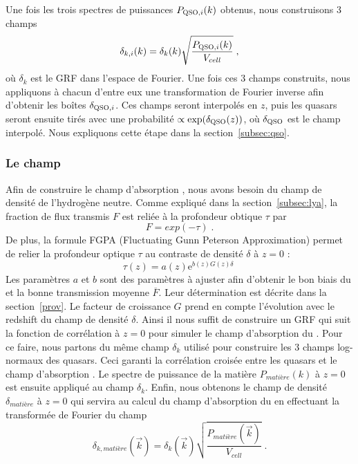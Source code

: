 \documentclass[11pt, twoside, a4paper, openright]{report}
\begin{document}
Une fois les trois spectres de puissances $P_{\textsc{QSO},i}(k)$ obtenus, nous construisons 3 champs
\begin{equation}
  \delta_{k,i}(k)  = \delta_k(k) \sqrt{\frac{P_{\textsc{QSO},i}(k)}{V_{cell}}} \; ,
\end{equation}
où $\delta_k$ est le GRF dans l'espace de Fourier. Une fois ces 3 champs construits, nous appliquons à chacun d'entre eux une transformation de Fourier inverse afin d'obtenir les boîtes $\delta_{\textsc{QSO}, i}$. Ces champs seront interpolés en $z$, puis les quasars seront ensuite tirés avec une probabilité $\propto \exp(\delta_{\textsc{QSO}}(z))$, où $\delta_{\textsc{QSO}}$ est le champ interpolé. Nous expliquons cette étape dans la section~\ref{subsec:qso}.


\subsubsection{Le champ \lya{}}
Afin de construire le champ d'absorption \lya{}, nous avons besoin du champ de densité de l'hydrogène neutre. Comme expliqué dans la section~\ref{subsec:lya}, la fraction de flux transmis $F$ est reliée à la profondeur obtique $\tau$ par
\begin{equation}
  F = exp(- \tau) \; .
\end{equation}
De plus, la formule FGPA (Fluctuating Gunn Peterson Approximation) permet de relier la profondeur optique $\tau$ au contraste de densité $\delta$ à $z = 0$ :
\begin{equation}
  \label{eq:fgpa1}
  \tau(z) = a(z) \mathrm{e}^{b(z) G(z) \delta} \;
\end{equation}
Les paramètres $a$ et $b$ sont des paramètres à ajuster afin d'obtenir le bon biais du \lya{} et la bonne transmission moyenne $\overline F$. Leur détermination est décrite dans la section~\ref{prov}. Le facteur de croissance $G$ prend en compte l'évolution avec le redshift du champ de densité $\delta$. Ainsi il nous suffit de construire un GRF qui suit la fonction de corrélation à $z=0$ pour simuler le champ d'absorption du \lya{}. Pour ce faire, nous partons du même champ $\delta_k$ utilisé pour construire les 3 champs log-normaux des quasars. Ceci garanti la corrélation croisée entre les quasars et le champ d'absorption \lya{}. Le spectre de puissance de la matière $P_{matière}(k)$ à $z=0$ est ensuite appliqué au champ $\delta_k$. Enfin, nous obtenons le champ de densité $\delta_{matière}$ à $z = 0$ qui servira au calcul du champ d'absorption du \lya{} en effectuant la transformée de Fourier du champ
\begin{equation}
  \delta_{k, matière}(\vec k)  = \delta_k(\vec k) \sqrt{\frac{P_{matière}(\vec k)}{V_{cell}}} \; .
\end{equation}
\end{document}
